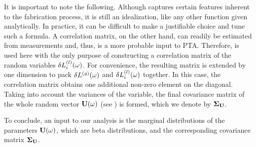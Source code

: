 It is important to note the following.
Although  captures certain features inherent to the fabrication process, it is still an idealization, like any other function given analytically.
In practice, it can be difficult to make a justifiable choice and tune such a formula.
A correlation matrix, on the other hand, can readily be estimated from measurements and, thus, is a more probable input to PTA.
Therefore,  is used here with the only purpose of constructing a correlation matrix of the random variables $\delta L^{(l)}_i(\omega)$.
For convenience, the resulting matrix is extended by one dimension to pack ${\delta L^{(g)}}(\omega)$ and $\delta L^{(l)}_i(\omega)$ together.
In this case, the correlation matrix obtains one additional non-zero element on the diagonal.
Taking into account the variances of the variable, the final covariance matrix of the whole random vector $\mathbf{U}(\omega)$ (see ) is formed, which we denote by $\mCov_\vU$.

To conclude, an input to our analysis is the marginal distributions of the parameters $\mathbf{U}(\omega)$, which are beta distributions, and the corresponding covariance matrix $\mCov_\vU$.
